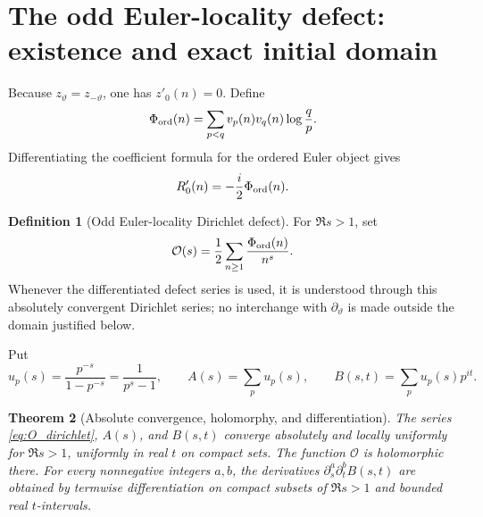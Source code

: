 \documentclass[11pt]{amsart}
\numberwithin{equation}{section}
\theoremstyle{plain}
\newtheorem{theorem}{Theorem}[section]
\theoremstyle{definition}
\newtheorem{definition}[theorem]{Definition}
\theoremstyle{remark}
\begin{document}
\section{The odd Euler-locality defect: existence and exact initial domain}
\label{sec:odd_euler_defect}

Because \(z_\vartheta=z_{-\vartheta}\), one has \(z'_0(n)=0\).  Define
\begin{equation}
\Phi_{\rm ord}(n)
=
\sum_{p<q}v_p(n)v_q(n)\log\frac qp.
\label{eq:Phi_ord}
\end{equation}
Differentiating the coefficient formula for the ordered Euler object gives
\begin{equation}
R'_0(n)=-\frac{i}{2}\Phi_{\rm ord}(n).
\label{eq:Rprime0}
\end{equation}

\begin{definition}[Odd Euler-locality Dirichlet defect]
\label{def:O_s}
For \(\Re s>1\), set
\begin{equation}
\mathcal O(s)
=
\frac12\sum_{n\ge1}\frac{\Phi_{\rm ord}(n)}{n^s}.
\label{eq:O_dirichlet}
\end{equation}
Whenever the differentiated defect series is used, it is understood through
this absolutely convergent Dirichlet series; no interchange with
\(\partial_\vartheta\) is made outside the domain justified below.
\end{definition}

Put
\begin{equation}
u_p(s)=\frac{p^{-s}}{1-p^{-s}}=\frac1{p^s-1},
\qquad
A(s)=\sum_pu_p(s),
\qquad
B(s,t)=\sum_pu_p(s)p^{it}.
\label{eq:A_B_def}
\end{equation}

\begin{theorem}[Absolute convergence, holomorphy, and differentiation]
\label{thm:O_initial_domain}
The series \eqref{eq:O_dirichlet}, \(A(s)\), and \(B(s,t)\) converge
absolutely and locally uniformly for \(\Re s>1\), uniformly in real \(t\) on
compact sets.  The function \(\mathcal O\) is holomorphic there.  For every
nonnegative integers \(a,b\), the derivatives
\(\partial_s^a\partial_t^bB(s,t)\) are obtained by termwise
differentiation on compact subsets of \(\Re s>1\) and bounded real
\(t\)-intervals.
\end{theorem}
\end{document}
